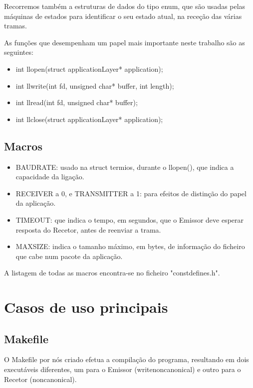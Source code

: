 \documentclass[article, a4paper, 11pt, oneside]{memoir}
\begin{document}
Recorremos também a estruturas de dados do tipo enum, que são usadas pelas máquinas de estados para identificar o seu estado atual, na receção das várias tramas.

As funções que desempenham um papel mais importante neste trabalho são as seguintes:
\begin{itemize}
	\item int llopen(struct applicationLayer* application);
	\item int llwrite(int fd, unsigned char* buffer, int length);
	\item int llread(int fd, unsigned char* buffer);
	\item int llclose(struct applicationLayer* application);
\end{itemize}

\section{Macros}
\begin{itemize}
	\item BAUDRATE: usado na struct termios, durante o llopen(), que indica a capacidade da ligação.
	\item RECEIVER a 0, e TRANSMITTER a 1: para efeitos de distinção do papel da aplicação.
	\item TIMEOUT: que indica o tempo, em segundos, que o Emissor deve esperar resposta do Recetor, antes de reenviar a trama.
	\item MAX\textunderscore SIZE: indica o tamanho máximo, em bytes, de informação do ficheiro que cabe num pacote da aplicação.
\end{itemize}

A listagem de todas as macros encontra-se no ficheiro "const\textunderscore defines.h".

\chapter[Casos de uso principais][Casos de uso principais]{Casos de uso principais} \label{\thechapter}

\section{Makefile}
O Makefile por nós criado efetua a compilação do programa, resultando em dois executáveis diferentes, um para o Emissor (writenoncanonical) 
e outro para o Recetor (noncanonical).
\end{document}
